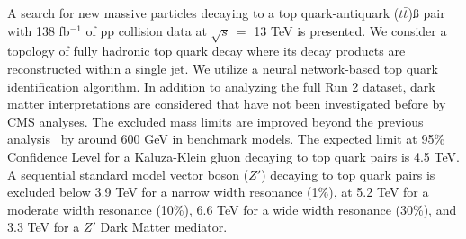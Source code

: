 
A search for new massive particles decaying to a top quark-antiquark ($t\bar{t}$)ß pair with 138 fb$^{-1}$ of pp collision data at $\sqrt{s}\ =$ 13 TeV is presented. We consider a topology of fully hadronic top quark decay where its decay products are reconstructed within a single jet. We utilize a neural network-based top quark identification algorithm. In addition to analyzing the full Run 2 dataset, dark matter interpretations are considered that have not been investigated before by CMS analyses. The excluded mass limits are improved beyond the previous analysis~\cite{13tevZprime_CMScombo2015} by around 600 GeV in benchmark models. The expected limit at 95\% Confidence Level for a Kaluza-Klein gluon decaying to top quark pairs is 4.5 TeV. A sequential standard model vector boson ($Z'$) decaying to top quark pairs is excluded below 3.9 TeV for a narrow width resonance (1\%), at 5.2 TeV for a moderate width resonance (10\%), 6.6 TeV for a wide width resonance (30\%), and 3.3 TeV for a $Z'$ Dark Matter mediator. 

